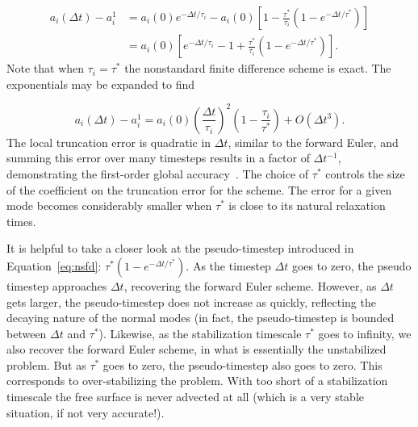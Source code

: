 \documentclass[preprint,12pt,authoryear]{elsarticle}
\newif\ifdetail
\begin{document}
\begin{equation}
\begin{aligned}
a_i(\Delta t) - a_i^{1} &= a_i(0) e^{-\Delta t/\tau_i} - a_i{(0)} \left[ 1 - \frac{\tau^*}{\tau_i} \left(1-e^{-\Delta t/\tau^*} \right) \right] \\
                        &= a_i{(0)} \left[ e^{-\Delta t/\tau_i} - 1 + \frac{\tau^*}{\tau_i} \left(1-e^{-\Delta t/\tau^*} \right) \right].
\end{aligned}
\end{equation}
Note that when $\tau_i = \tau^*$ the nonstandard finite difference scheme is exact.
The exponentials may be expanded to find
\ifdetail
\begin{equation}
a_i(\Delta t) - a_i^{1} = - a_i{(0)} \left[ \left(\frac{\Delta t}{\tau_i}\right)^2 - \frac{\tau^*}{\tau_i} \left(\frac{\Delta t }{\tau^* }\right)^2 \right].
\end{equation}
\fi
\begin{equation}
a_i(\Delta t) - a_i^{1} = {a_i{(0)} } \left( \frac{\Delta t}{\tau_i} \right)^2 \left( 1 - \frac{\tau_i}{\tau^*} \right) + O(\Delta t^3).
\end{equation}
The local truncation error is quadratic in $\Delta t$, similar to the forward Euler, and summing this error over 
many timesteps results in a factor of $\Delta t^{-1}$, demonstrating the first-order global accuracy~\citep[e.g.][]{leveque2007finite}.
The choice of $\tau^*$ controls the size of the coefficient on the truncation error for the scheme.
The error for a given mode becomes considerably smaller when $\tau^*$ is close to its natural relaxation times.

It is helpful to take a closer look at the pseudo-timestep introduced in Equation~\eqref{eq:nsfd}: $\tau^*(1-e^{-\Delta t/\tau^*})$.
As the timestep $\Delta t$ goes to zero, the pseudo timestep approaches $\Delta t$, recovering 
the forward Euler scheme. However, as $\Delta t$ gets larger, the pseudo-timestep does not 
increase as quickly, reflecting the decaying nature of the normal modes
(in fact, the pseudo-timestep is bounded between $\Delta t$ and $\tau^*$).
Likewise, as the stabilization timescale $\tau^*$ goes to infinity, we also recover the 
forward Euler scheme, in what is essentially the unstabilized problem. But as $\tau^*$
goes to zero, the pseudo-timestep also goes to zero. This corresponds to over-stabilizing the
problem. With too short of a stabilization timescale the free surface is never advected 
at all (which is a very stable situation, if not very accurate!).
\end{document}
